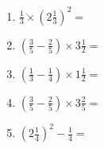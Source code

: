 \documentclass[12pt]{article}
\begin{document}
\begin{enumerate}
\item \large $ \frac{1}{3} \times \left( 2 \frac{1}{3} \right)^2 = $ \vspace{1.6cm}
\item \large $ \left( \frac{3}{5} - \frac{2}{5} \right) \times 3 \frac{1}{2} = $ \vspace{1.6cm}
\item \large $ \left( \frac{1}{3} - \frac{1}{4} \right) \times 1 \frac{1}{2} = $ \vspace{1.6cm}
\item \large $ \left( \frac{3}{5} - \frac{2}{5} \right) \times 3 \frac{2}{5} = $ \vspace{1.6cm}
\item \large $ \left( 2 \frac{1}{4} \right)^2 - \frac{1}{4} = $ \vspace{1.6cm}
\end{enumerate}\newpage
\end{document}
